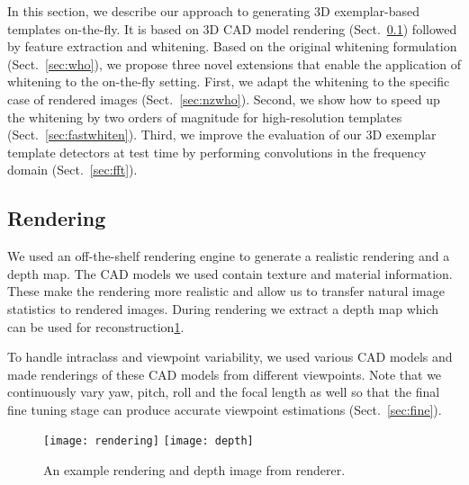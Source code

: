 In this section, we describe our approach to generating 3D
exemplar-based templates on-the-fly. It is based on 3D CAD model
rendering (Sect.~\ref{sec:rendering}) followed by feature extraction
and whitening. Based on the original whitening
formulation (Sect.~\ref{sec:who}), we propose three novel extensions that
enable the application of whitening to the on-the-fly setting.
%
First, we adapt the whitening to the specific case of rendered
images (Sect.~\ref{sec:nzwho}). Second, we show how to speed up the
whitening by two orders of magnitude for high-resolution templates
(Sect.~\ref{sec:fastwhiten}). Third, we improve the evaluation of our
3D exemplar template detectors at test time by performing
convolutions in the frequency domain (Sect.~\ref{sec:fft}).


\subsection{Rendering}
\label{sec:rendering}

We used an off-the-shelf rendering engine to generate a realistic rendering
and a depth map. The CAD models we used contain texture and material
information. These make the rendering more realistic and allow us to transfer
natural image statistics to rendered images. During rendering we extract a depth map which can be used for
reconstruction\ref{fig:rendering}.

To handle intraclass and viewpoint variability, we used various CAD models and
made renderings of these CAD models from different viewpoints. Note that we
continuously vary yaw, pitch, roll and the focal length as well so that the
final fine tuning stage can produce accurate viewpoint estimations
(Sect.~\ref{sec:fine}).

\begin{figure}[t]
  \begin{center}
    \texttt{[image: rendering]}
    \texttt{[image: depth]}
  \end{center}
  \caption{An example rendering and depth image from renderer.}
  \label{fig:rendering}
\end{figure}


